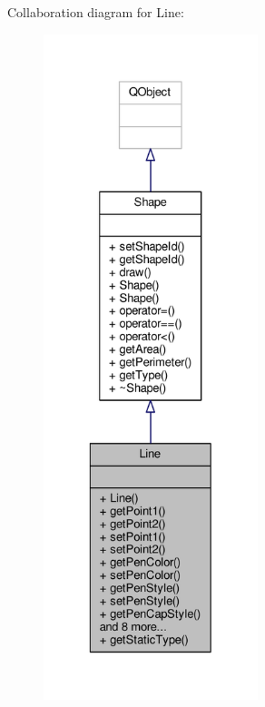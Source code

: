 Collaboration diagram for Line\+:\nopagebreak
\begin{figure}[H]
\begin{center}
\leavevmode
\includegraphics[height=550pt]{classLine__coll__graph}
\end{center}
\end{figure}
